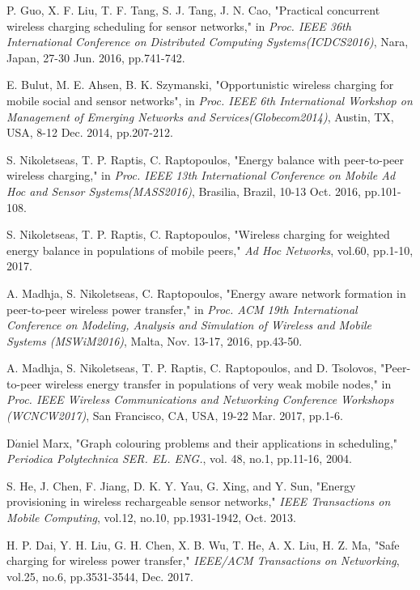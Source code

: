 \documentclass[journal,10pt]{IEEEtran}
\begin{document}
\begin{thebibliography}{11}
P. Guo, X. F. Liu, T. F. Tang, S. J. Tang, J. N. Cao, "Practical concurrent wireless charging scheduling for sensor networks," in \textit{Proc. IEEE 36th International Conference on Distributed Computing Systems(ICDCS2016)}, Nara, Japan, 27-30 Jun. 2016, pp.741-742.

E. Bulut, M. E. Ahsen, B. K. Szymanski, "Opportunistic wireless charging for mobile social and sensor networks", in \textit{Proc. IEEE 6th International Workshop on Management of Emerging Networks and Services(Globecom2014)}, Austin, TX, USA, 8-12 Dec. 2014, pp.207-212.

S. Nikoletseas, T. P. Raptis, C. Raptopoulos, "Energy balance with peer-to-peer wireless charging," in \textit{Proc. IEEE 13th International Conference on Mobile Ad Hoc and Sensor Systems(MASS2016)}, Brasilia, Brazil, 10-13 Oct. 2016, pp.101-108.

S. Nikoletseas, T. P. Raptis, C. Raptopoulos, "Wireless charging for weighted energy balance in populations of mobile peers," \textit{Ad Hoc Networks}, vol.60, pp.1-10, 2017.

A. Madhja, S. Nikoletseas, C. Raptopoulos, "Energy aware network formation in peer-to-peer wireless power transfer," in \textit{Proc. ACM 19th International Conference on Modeling, Analysis and Simulation of Wireless and Mobile Systems (MSWiM2016)}, Malta, Nov. 13-17, 2016, pp.43-50.

A. Madhja, S. Nikoletseas, T. P. Raptis, C. Raptopoulos, and D. Tsolovos, "Peer-to-peer wireless energy transfer in populations of very weak mobile nodes," in \textit{Proc. IEEE Wireless Communications and Networking Conference Workshops (WCNCW2017)}, San Francisco, CA, USA, 19-22 Mar. 2017, pp.1-6.

D$\acute{a}$niel Marx, "Graph colouring problems and their applications in scheduling," \textit{Periodica Polytechnica SER. EL. ENG.}, vol. 48, no.1, pp.11-16, 2004.

S. He, J. Chen, F. Jiang, D. K. Y. Yau, G. Xing, and Y. Sun, "Energy provisioning in wireless rechargeable sensor networks," \textit{IEEE Transactions on Mobile Computing}, vol.12, no.10, pp.1931-1942, Oct. 2013.

H. P. Dai, Y. H. Liu, G. H. Chen, X. B. Wu, T. He, A. X. Liu, H. Z. Ma, "Safe charging for wireless power transfer," \textit{IEEE/ACM Transactions on Networking}, vol.25, no.6, pp.3531-3544, Dec. 2017.


\end{thebibliography}
\end{document}
